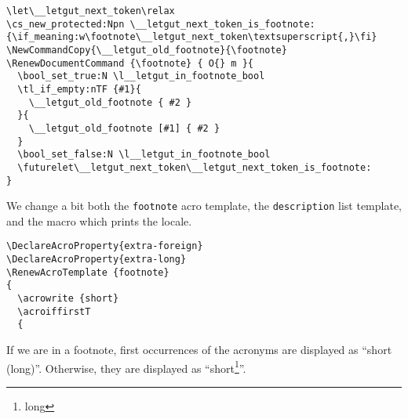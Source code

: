 \documentclass{letgut}
\begin{document}
\begin{lstlisting}
\let\__letgut_next_token\relax
\cs_new_protected:Npn \__letgut_next_token_is_footnote:
{\if_meaning:w\footnote\__letgut_next_token\textsuperscript{,}\fi}
\NewCommandCopy{\__letgut_old_footnote}{\footnote}
\RenewDocumentCommand {\footnote} { O{} m }{
  \bool_set_true:N \l__letgut_in_footnote_bool
  \tl_if_empty:nTF {#1}{
    \__letgut_old_footnote { #2 }
  }{
    \__letgut_old_footnote [#1] { #2 }
  }
  \bool_set_false:N \l__letgut_in_footnote_bool
  \futurelet\__letgut_next_token\__letgut_next_token_is_footnote:
}
\end{lstlisting}
We change a bit both the \lstinline+footnote+ acro template, the \lstinline+description+ list
template, and the macro which prints the locale.
\begin{lstlisting}
\DeclareAcroProperty{extra-foreign}
\DeclareAcroProperty{extra-long}
\RenewAcroTemplate {footnote}
{
  \acrowrite {short}
  \acroiffirstT
  {
\end{lstlisting}
If we are in a footnote, first occurrences of the acronyms are displayed
as “short (long)”. Otherwise, they are displayed as “short\footnote{long}”.
\end{document}
